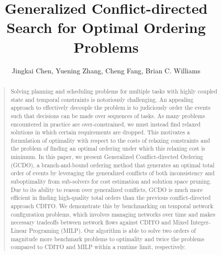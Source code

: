 \documentclass[letterpaper]{article} %
\theoremstyle{definition}
\begin{document}

\title{Generalized Conflict-directed Search for Optimal Ordering Problems}


\author{
    Jingkai Chen,
    Yuening Zhang,
    Cheng Fang,
    Brian C. Williams
    \\
}
\maketitle

\maketitle
\begin{abstract}
\begin{quote}
Solving planning and scheduling problems for multiple tasks with highly coupled state and temporal constraints is notoriously challenging. An appealing approach to effectively decouple the problem is to judiciously order the events such that decisions can be made over sequences of tasks. As many problems encountered in practice are over-constrained, we must instead find relaxed solutions in which certain requirements are dropped. This motivates a formulation of optimality with respect to the costs of relaxing constraints and the problem of finding an optimal ordering under which this relaxing cost is minimum. In this paper, we present Generalized Conflict-directed Ordering (GCDO), a branch-and-bound ordering method that generates an optimal total order of events by leveraging the generalized conflicts of both inconsistency and suboptimality from sub-solvers for cost estimation and solution space pruning. Due to its ability to reason over generalized conflicts, GCDO is much more efficient in finding high-quality total orders than the previous conflict-directed approach CDITO. We demonstrate this by benchmarking on temporal network configuration problems, which involves managing networks over time and makes necessary tradeoffs between network flows against CDITO and Mixed Integer-Linear Programing (MILP). Our algorithm is able to solve two orders of magnitude more benchmark problems to optimality and twice the problems compared to CDITO and MILP within a runtime limit, respectively.
\end{quote}
\end{abstract}
\end{document}
